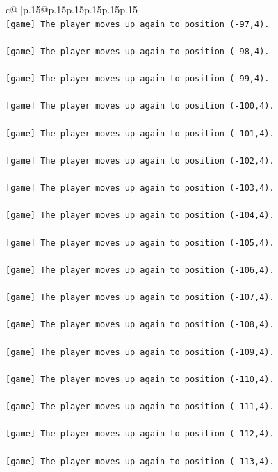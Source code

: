 \documentclass{article}
\begin{document}
{\begin{supertabular}{c@{$\;$}|p{.15\linewidth}@{}p{.15\linewidth}p{.15\linewidth}p{.15\linewidth}p{.15\linewidth}p{.15\linewidth}}
{{{\\ 
\texttt{{[}game{]} The player moves up again to position ({-}97,4).} \\
\\ 
\texttt{{[}game{]} The player moves up again to position ({-}98,4).} \\
\\ 
\texttt{{[}game{]} The player moves up again to position ({-}99,4).} \\
\\ 
\texttt{{[}game{]} The player moves up again to position ({-}100,4).} \\
\\ 
\texttt{{[}game{]} The player moves up again to position ({-}101,4).} \\
\\ 
\texttt{{[}game{]} The player moves up again to position ({-}102,4).} \\
\\ 
\texttt{{[}game{]} The player moves up again to position ({-}103,4).} \\
\\ 
\texttt{{[}game{]} The player moves up again to position ({-}104,4).} \\
\\ 
\texttt{{[}game{]} The player moves up again to position ({-}105,4).} \\
\\ 
\texttt{{[}game{]} The player moves up again to position ({-}106,4).} \\
\\ 
\texttt{{[}game{]} The player moves up again to position ({-}107,4).} \\
\\ 
\texttt{{[}game{]} The player moves up again to position ({-}108,4).} \\
\\ 
\texttt{{[}game{]} The player moves up again to position ({-}109,4).} \\
\\ 
\texttt{{[}game{]} The player moves up again to position ({-}110,4).} \\
\\ 
\texttt{{[}game{]} The player moves up again to position ({-}111,4).} \\
\\ 
\texttt{{[}game{]} The player moves up again to position ({-}112,4).} \\
\\ 
\texttt{{[}game{]} The player moves up again to position ({-}113,4).} \\
}}}
\end{supertabular}}
\end{document}
